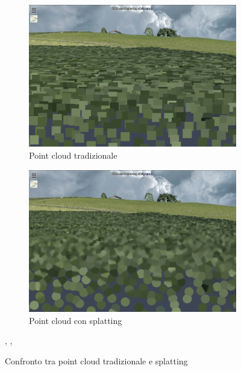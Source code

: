 \begin{figure}[htbp]
	\centering
	
	\begin{subfigure}{0.45\textwidth}
		\includegraphics[width=\linewidth,  trim={80 40 80 40}, clip]{images/points.jpg}
		\caption{Point cloud tradizionale} 
		\label{fig:point_cloud_traditional}
	\end{subfigure}
	\hfill
	\begin{subfigure}{0.45\textwidth}
		\includegraphics[width=\linewidth, trim={80 40 80 40}, clip]{images/splats.jpg}
		\caption{Point cloud con splatting}  
		\label{fig:point_cloud_with_splatting}
	\end{subfigure}
	\caption{Confronto tra point cloud tradizionale e splatting} \cite{point_cloud_traditional}, \cite{point_cloud_with_splatting}
	\label{fig:comparison_point_clouds}
	,
\end{figure}


